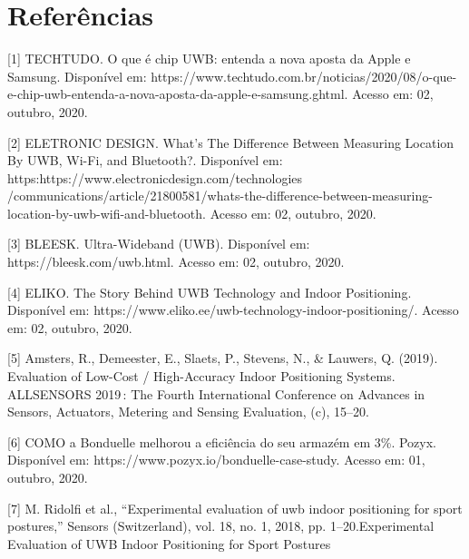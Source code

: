 \chapter{Referências}
[1] TECHTUDO. O que é chip UWB: entenda a nova aposta da Apple e Samsung. Disponível em: https://www.techtudo.com.br/noticias/2020/08/o-que-e-chip-uwb-entenda-a-nova-aposta-da-apple-e-samsung.ghtml. Acesso em: 02, outubro, 2020.

[2] ELETRONIC DESIGN. What’s The Difference Between Measuring Location By UWB, Wi-Fi, and Bluetooth?. Disponível em: https:https://www.electronicdesign.com/technologies
/communications/article/21800581/whats-the-difference-between-measuring-location-by-uwb-wifi-and-bluetooth. Acesso em: 02, outubro, 2020.

[3] BLEESK. Ultra-Wideband (UWB). Disponível em: https://bleesk.com/uwb.html. Acesso em: 02, outubro, 2020.

[4] ELIKO. The Story Behind UWB Technology and Indoor Positioning. Disponível em: https://www.eliko.ee/uwb-technology-indoor-positioning/. Acesso em: 02, outubro, 2020.

[5] Amsters, R., Demeester, E., Slaets, P., Stevens, N., & Lauwers, Q. (2019). Evaluation of Low-Cost / High-Accuracy Indoor Positioning Systems. ALLSENSORS 2019 : The Fourth International Conference on Advances in Sensors, Actuators, Metering and Sensing Evaluation, (c), 15–20.

[6] COMO a Bonduelle melhorou a eficiência do seu armazém em 3\%. Pozyx. Disponível em: https://www.pozyx.io/bonduelle-case-study. Acesso em: 01, outubro, 2020.

[7] M. Ridolfi et al., “Experimental evaluation of uwb indoor positioning for sport postures,” Sensors (Switzerland), vol. 18, no. 1, 2018, pp. 1–20.Experimental Evaluation of UWB Indoor Positioning for Sport Postures